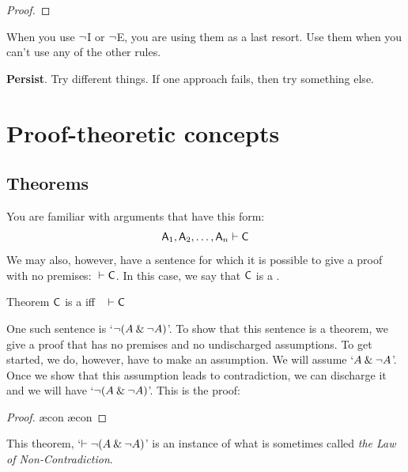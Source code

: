 \begin{earg}
\begin{proof}
	 \pr{}
	\open
		\as{}
	\close
	\ci{}
\end{proof}

\medskip

\item[\ex{18-7}] When you use ${\neg}$I or ${\neg}$E, you are using them as a last resort. Use them when you can't use any of the other rules.
\medskip

\item[\ex{18-8}] \textbf{Persist}. Try different things. If one approach fails, then try something else.
\end{earg}




\chapter{Proof-theoretic concepts}\label{s:ProofTheoreticConcepts}

\section{Theorems}

You are familiar with arguments that have this form:
$$\mathsf{A}_1, \mathsf{A}_2, \ldots, \mathsf{A}_n \vdash \mathsf{C}$$
We may also, however, have a sentence for which it is possible to give a proof with no premises: ${} \vdash \mathsf{C}$. In this case, we say that $\mathsf{C}$ is a .

\begin{factboxy}{Theorem}\label{def:syntactic_tautology_in_sl}
$\mathsf{C}$ is a  iff ~ $\vdash \mathsf{C}$
\end{factboxy}

One such sentence is `${\neg} (A \mathbin{\&} {\neg} A)$'. To show that this sentence is a theorem, we give a proof that has no premises and no undischarged assumptions. To get started, we do, however, have to make an assumption. We will assume `$A \mathbin{\&} {\neg} A$'. Once we show that this assumption leads to contradiction, we can discharge it and we will have `${\neg} (A \mathbin{\&} {\neg} A)$'. This is the proof:
	\begin{proof}
		\open
			\ae{con}
			\ae{con}
		\close
	\end{proof}
This theorem, `$\vdash {\neg} (A \mathbin{\&} {\neg} A)$' is an instance of what is sometimes called \emph{the Law of Non-Contradiction}.

